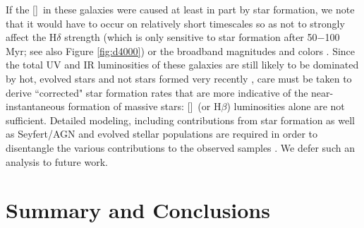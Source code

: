 \documentclass[twocolumn,natbib,iop,hyperref]{aastex62}
\newcommand{\hb}{H$\beta$}
\newcommand{\oii}{[\ion{O}{2}]}
\begin{document}
If the \oii\ in these galaxies were caused at least in part by star formation, we note that it would have to occur on relatively short timescales so as not to strongly affect the H$\delta$ strength (which is only sensitive to star formation after 50$-$100 Myr; see also Figure \ref{fig:d4000}) or the broadband magnitudes and colors \cite[see][and submitted]{2018ApJ...855...85W}.  Since the total UV and IR luminosities of these galaxies are still likely to be dominated by hot, evolved stars and not stars formed very recently \citep{2007ApJ...671..285T,2014ApJ...796...35F,2019ApJ...877..140L}, care must be taken to derive ``corrected" star formation rates that are more indicative of the near-instantaneous formation of massive stars: \oii\ (or \hb) luminosities alone are not sufficient.  Detailed modeling, including contributions from star formation as well as Seyfert/AGN and evolved stellar populations are required in order to disentangle the various contributions to the observed samples \citep{2018MNRAS.481..476Y}.  We defer such an analysis to future work.



\section{Summary and Conclusions}
\label{sec:conclusions}
\end{document}
